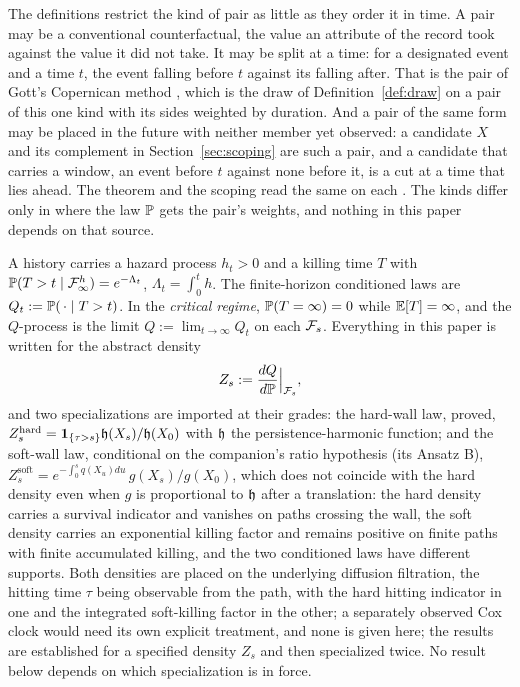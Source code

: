 \begin{remark}\label{rem:pairkinds}
The definitions restrict the kind of pair as little as they order it in
time. A pair may be a conventional counterfactual, the value an
attribute of the record took against the value it did not take. It may
be split at a time: for a designated event and a time $t$, the event
falling before $t$ against its falling after. That is the pair of
Gott's Copernican method \cite{Gott1993}, which is the draw of
Definition~\ref{def:draw} on a pair of this one kind with its sides
weighted by duration. And a pair of the same form may be placed in the
future with neither member yet observed: a candidate $X$ and its
complement in Section~\ref{sec:scoping} are such a pair, and a
candidate that carries a window, an event before $t$ against none
before it, is a cut at a time that lies ahead. The theorem and the
scoping read the same on each \cite{Nexus}. The kinds differ only in
where the law $\mathbb{P}$ gets the pair's weights, and nothing in this paper
depends on that source.
\end{remark}

\begin{definition}
\label{def:model}
A history carries a hazard process $h_t>0$ and a killing time $T$ with
$\mathbb{P}(T>t\mid\mathcal{F}^{h}_\infty)=e^{-\Lambda_t}$, $\Lambda_t=\int_0^th$. The
finite-horizon conditioned laws are $Q_t:=\mathbb{P}(\,\cdot\mid T>t)$. In the
\emph{critical regime}, $\mathbb{P}(T=\infty)=0$ while $\mathbb{E}[T]=\infty$, and the
$Q$-process is the limit $Q:=\lim_{t\to\infty}Q_t$ on each $\mathcal{F}_s$.
Everything in this paper is written for the abstract density
\[
Z_s:=\frac{dQ}{d\mathbb{P}}\Big|_{\mathcal{F}_s},
\]
and two specializations are imported at their grades: the hard-wall
law, proved, $Z^{\mathrm{hard}}_s=\mathbf{1}_{\{\tau>s\}}\mathfrak{h}(X_s)/\mathfrak{h}(X_0)$ with
$\mathfrak{h}$ the persistence-harmonic function; and the soft-wall law,
conditional on the companion's ratio hypothesis (its Ansatz B),
$Z^{\mathrm{soft}}_s=e^{-\int_0^sq(X_u)du}\,g(X_s)/g(X_0)$, which
does not coincide with the hard density even when $g$ is proportional to $\mathfrak{h}$ after a translation: the hard density carries a survival indicator and vanishes on paths crossing the wall, the soft density carries an exponential killing factor and remains positive on finite paths with finite accumulated killing, and the two conditioned laws have different supports. Both densities are placed on the underlying diffusion filtration, the hitting time $\tau$ being observable from the path, with the hard hitting indicator in one and the integrated soft-killing factor in the other; a separately observed Cox clock would need its own explicit treatment, and none is given here; the results are established for a specified density $Z_s$ and then specialized twice. No result below depends on which
specialization is in force.
\end{definition}

